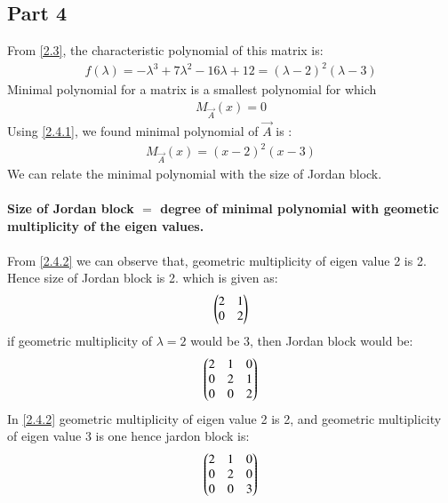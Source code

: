 \documentclass[journal,12pt,twocolumn]{IEEEtran}
\numberwithin{table}{section}
\begin{document}
 \subsection{Part 4}
 From \eqref{2.3}, the characteristic polynomial of this matrix is: 
 \begin{align}
f(\lambda) = -{\lambda}^3+7{\lambda}^2 -16\lambda +12 = (\lambda - 2)^2 (\lambda - 3)
 \end{align}
 Minimal polynomial for a matrix is a smallest polynomial for which
 \begin{align}
 M_{\vec{A}}(x) = 0 \label{2.4.1}
 \end{align}
 Using \eqref{2.4.1}, we found minimal polynomial of $\vec{A}$ is :
 \begin{align}
 M_{\vec{A}}(x) = (x-2)^2(x-3) \label{2.4.2}
 \end{align}	
 We can relate the minimal polynomial with the size of Jordan block.\\\\
 
\textbf{Size of Jordan block $=$ degree of minimal polynomial with geometic multiplicity of the eigen values.}\\\\
From \eqref{2.4.2} we can observe that, geometric multiplicity of eigen value 2 is 2. Hence size of Jordan block is 2. which is given as:
\begin{align}
\begin{pmatrix}2 & 1 \\ 0 & 2 \end{pmatrix}
\end{align}
if geometric multiplicity of $\lambda = 2$ would be 3, then Jordan block would be:
\begin{align}
\begin{pmatrix}2 & 1 & 0 \\ 0 & 2 & 1 \\ 0 & 0 &2\end{pmatrix}
\end{align}
In \eqref{2.4.2} geometric multiplicity of eigen value 2 is 2, and geometric multiplicity of eigen value 3 is one hence jardon block is:
\begin{align}
\begin{pmatrix}2 & 1 & 0 \\ 0 & 2 & 0 \\ 0 & 0 & 3\end{pmatrix}
\end{align}
\end{document}
